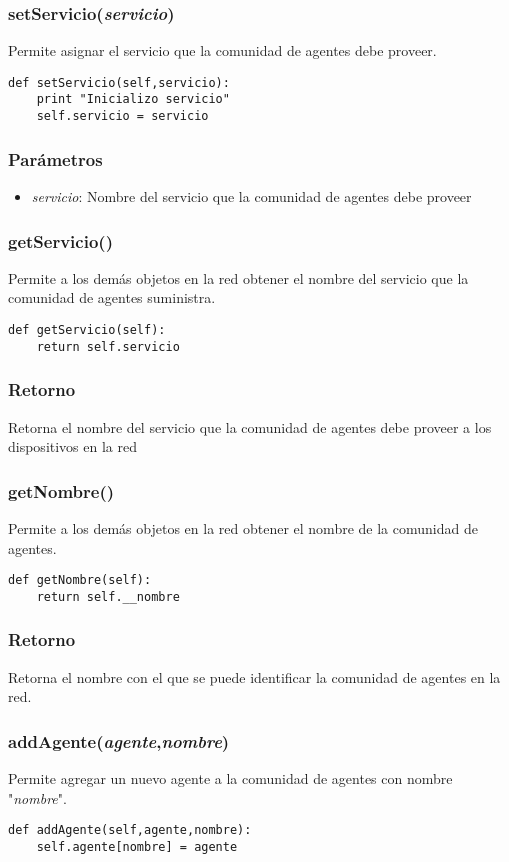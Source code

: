 \documentclass{article}
\begin{document}
\subsubsection{\textbf{setServicio}(\textit{servicio})}
Permite asignar el servicio que la comunidad de agentes debe proveer.
\begin{lstlisting}
def setServicio(self,servicio):
	print "Inicializo servicio"
	self.servicio = servicio
\end{lstlisting}
\subsubsection*{Parámetros}
\begin{itemize}
\item \textit{servicio}: Nombre del servicio que la comunidad de agentes debe proveer
\end{itemize}
\subsubsection{\textbf{getServicio}()}
Permite a los demás objetos en la red obtener el nombre del servicio que la comunidad de agentes suministra.
\begin{lstlisting}
def getServicio(self):
	return self.servicio
\end{lstlisting}
\subsubsection*{Retorno}
Retorna el nombre del servicio que la comunidad de agentes debe proveer a los dispositivos en la red
\subsubsection{\textbf{getNombre}()}
Permite a los demás objetos en la red obtener el nombre de la comunidad de agentes.
\begin{lstlisting}
def getNombre(self):
    return self.__nombre
\end{lstlisting}
\subsubsection*{Retorno}
Retorna el nombre con el que se puede identificar la comunidad de agentes en la red.
\subsubsection{\textbf{addAgente}(\textit{agente},\textit{nombre})}
Permite agregar un nuevo agente a la comunidad de agentes con nombre "\textit{nombre}".
\begin{lstlisting}
def addAgente(self,agente,nombre):
	self.agente[nombre] = agente
\end{lstlisting}
\end{document}
